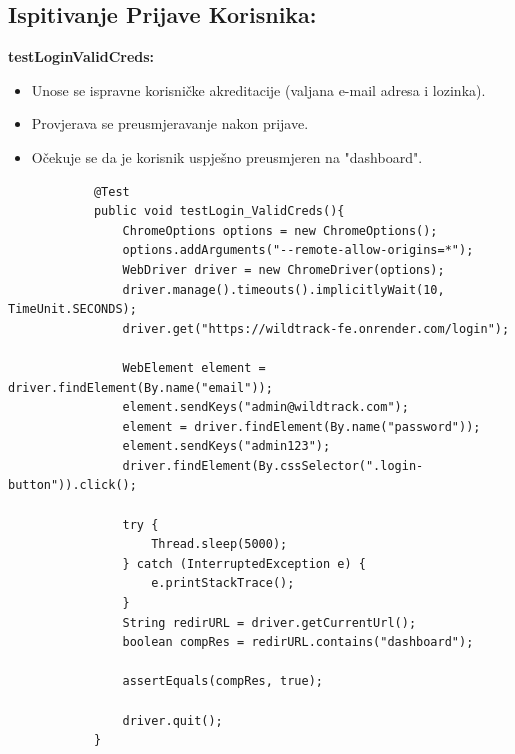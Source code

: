 			\subsection{Ispitivanje Prijave Korisnika:}
			\textbf{testLoginValidCreds:}
			\begin{itemize}
				\item Unose se ispravne korisničke akreditacije (valjana e-mail adresa i lozinka).
				\item Provjerava se preusmjeravanje nakon prijave.
				\item Očekuje se da je korisnik uspješno preusmjeren na "dashboard".
			\end{itemize}
			\begin{lstlisting}
			@Test
			public void testLogin_ValidCreds(){
				ChromeOptions options = new ChromeOptions();
				options.addArguments("--remote-allow-origins=*");
				WebDriver driver = new ChromeDriver(options);
				driver.manage().timeouts().implicitlyWait(10, TimeUnit.SECONDS);
				driver.get("https://wildtrack-fe.onrender.com/login");
				
				WebElement element = driver.findElement(By.name("email"));
				element.sendKeys("admin@wildtrack.com");
				element = driver.findElement(By.name("password"));
				element.sendKeys("admin123");
				driver.findElement(By.cssSelector(".login-button")).click();
				
				try {
					Thread.sleep(5000);
				} catch (InterruptedException e) {
					e.printStackTrace();
				}
				String redirURL = driver.getCurrentUrl();
				boolean compRes = redirURL.contains("dashboard");
				
				assertEquals(compRes, true);
				
				driver.quit();
			}
			\end{lstlisting}
			
